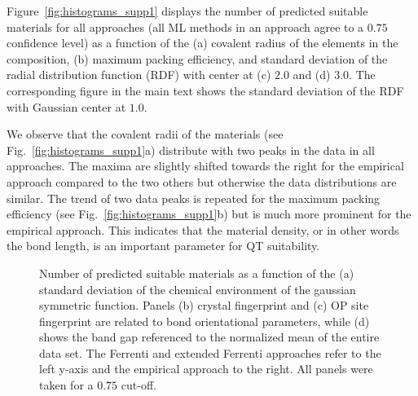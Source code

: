 \documentclass[superscriptaddress,unsortedaddress,
 amsmath,amssymb,
 aps,
]{revtex4-2}
\begin{document}
Figure~\ref{fig:histograms_supp1} displays the number of predicted suitable materials for all approaches (all ML methods in an approach agree to a $0.75$ confidence level) as a function of the (a) covalent radius of the elements in the composition, (b) maximum packing efficiency, and standard deviation of the radial distribution function (RDF) with center at (c) $2.0$ and (d) $3.0$. The corresponding figure in the main text shows the standard deviation of the RDF with Gaussian center at $1.0$. 

We observe that the covalent radii of the materials (see Fig.~\ref{fig:histograms_supp1}a) distribute with two peaks in the data in all approaches. The maxima are slightly shifted towards the right for the empirical approach compared to the two others but otherwise the data distributions are similar. The trend of two data peaks is repeated for the maximum packing efficiency (see Fig.~\ref{fig:histograms_supp1}b) but is much more prominent for the empirical approach. This indicates that the material density, or in other words the bond length, is an important parameter for QT suitability.  

\begin{figure}[ht!]
\begin{subfigure}[t]{1\textwidth}
    
\end{subfigure}
\begin{subfigure}[b]{0.45\textwidth}
    \scalebox{0.85}{}
    \subcaption{}
\end{subfigure}
\begin{subfigure}[b]{0.45\textwidth}
    \scalebox{0.85}{}
    \subcaption{}
\end{subfigure}%

\begin{subfigure}[b]{0.45\textwidth}
    \scalebox{0.85}{}
    \subcaption{}
\end{subfigure}
\begin{subfigure}[b]{0.45\textwidth}
    \scalebox{0.85}{}
    \subcaption{}
\end{subfigure}
\caption{Number of predicted suitable materials as a function of the (a) standard deviation of the chemical environment of the gaussian symmetric function. Panels (b) crystal fingerprint and (c) OP site fingerprint are related to bond orientational parameters, while (d) shows the band gap referenced to the normalized mean of the entire data set. 
The Ferrenti and extended Ferrenti approaches refer to the left y-axis and the empirical approach to the right. All panels were taken for a $0.75$ cut-off. }
\label{fig:histograms_supp2}
\end{figure}
\end{document}
